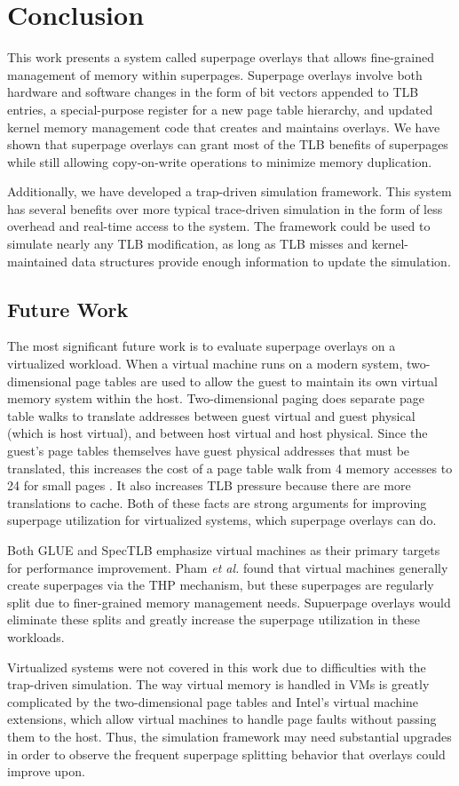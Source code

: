 \chapter{Conclusion}

This work presents a system called superpage overlays that allows fine-grained management of memory within superpages. Superpage overlays involve both hardware and software changes in the form of bit vectors appended to TLB entries, a special-purpose register for a new page table hierarchy, and updated kernel memory management code that creates and maintains overlays. We have shown that superpage overlays can grant most of the TLB benefits of superpages while still allowing copy-on-write operations to minimize memory duplication.

Additionally, we have developed a trap-driven simulation framework. This system has several benefits over more typical trace-driven simulation in the form of less overhead and real-time access to the system. The framework could be used to simulate nearly any TLB modification, as long as TLB misses and kernel-maintained data structures provide enough information to update the simulation.

\section{Future Work}
The most significant future work is to evaluate superpage overlays on a virtualized workload. When a virtual machine runs on a modern system, two-dimensional page tables are used to allow the guest to maintain its own virtual memory system within the host. Two-dimensional paging does separate page table walks to translate addresses between guest virtual and guest physical (which is host virtual), and between host virtual and host physical. Since the guest's page tables themselves have guest physical addresses that must be translated, this increases the cost of a page table walk from 4 memory accesses to 24 for small pages \cite{Bhargava}. It also increases TLB pressure because there are more translations to cache. Both of these facts are strong arguments for improving superpage utilization for virtualized systems, which superpage overlays can do.

Both GLUE \cite{Pham} and SpecTLB \cite{Barr} emphasize virtual machines as their primary targets for performance improvement. Pham \emph{et al.} found that virtual machines generally create superpages via the THP mechanism, but these superpages are regularly split due to finer-grained memory management needs. Supuerpage overlays would eliminate these splits and greatly increase the superpage utilization in these workloads.

Virtualized systems were not covered in this work due to difficulties with the trap-driven simulation. The way virtual memory is handled in VMs is greatly complicated by the two-dimensional page tables and Intel's virtual machine extensions, which allow virtual machines to handle page faults without passing them to the host. Thus, the simulation framework may need substantial upgrades in order to observe the frequent superpage splitting behavior that overlays could improve upon.
